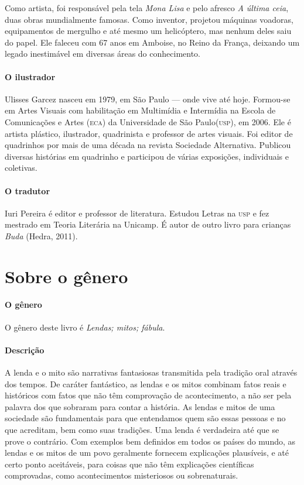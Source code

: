 \documentclass[11pt]{extarticle}
\begin{document}
Como artista, foi responsável pela tela \textit{Mona Lisa} e pelo afresco \textit{A última ceia}, duas obras mundialmente famosas. Como inventor, projetou máquinas voadoras, equipamentos de mergulho e até mesmo um helicóptero, mas nenhum deles saiu do papel. Ele faleceu com 67 anos em Amboise, no Reino da França, deixando um legado inestimável em diversas áreas do conhecimento.

\paragraph{O ilustrador} Ulisses Garcez nasceu em 1979, em São Paulo --- onde vive até hoje. Formou-se em Artes Visuais com habilitação em Multimídia e Intermídia na Escola de Comunicações e Artes (\textsc{eca}) da Universidade de São Paulo(\textsc{usp}), em 2006. Ele é artista plástico, ilustrador, quadrinista e professor de artes visuais. Foi editor de quadrinhos por mais de uma década na revista Sociedade Alternativa. Publicou diversas histórias em quadrinho e participou de várias exposições, individuais e coletivas.

\paragraph{O tradutor} Iuri Pereira é editor e professor de literatura. Estudou Letras na \textsc{usp} e fez mestrado em Teoria Literária na Unicamp. É autor de outro livro para crianças \textit{Buda} (Hedra, 2011).


\section{Sobre o gênero}

\paragraph{O gênero} O gênero deste livro é \textit{Lendas; mitos; fábula}. 

\paragraph{Descrição} A lenda e o mito são narrativas fantasiosas transmitida pela tradição oral através dos tempos. De caráter fantástico, as lendas e os mitos combinam fatos reais e históricos com fatos que não têm comprovação de acontecimento, a não ser pela palavra dos que sobraram para contar a história. As lendas e mitos de uma sociedade são fundamentais para que entendamos quem são essas pessoas e no que acreditam, bem como suas tradições. Uma lenda é verdadeira até que se prove o contrário. Com exemplos bem definidos em todos os países do mundo, as lendas e os mitos de um povo geralmente fornecem explicações plausíveis, e até certo ponto aceitáveis, para coisas que não têm explicações científicas comprovadas, como acontecimentos misteriosos ou sobrenaturais.
\end{document}
